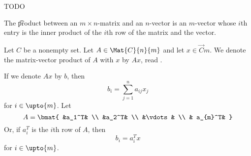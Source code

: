 
\sbasic






























\sstart
{}


TODO


The \t{product} between an $m \times n$-matrix and an $n$-vector is an $m$-vector whose $i$th entry is the inner product of the $i$th row of the matrix and the vector.


Let $C$ be a nonempty set.
Let $A \in \Mat{C}{n}{m}$ and let $x \in \Vec{C}{m}$. We denote the matrix-vector product of $A$ with $x$ by $Ax$, read .

If we denote $Ax$ by $b$, then
$$
  b_i = \sum_{j = 1}^{n} a_{ij}x_j
$$
for $i \in \upto{m}$.
Let
$$
  A = \bmat{
    &a_1^T& \\
    &a_2^T& \\
    &\vdots & \\
    & a_{m}^T&
  }
$$
Or, if $a_i^T$ is the $i$th row of $A$, then
$$
  b_i = a_i^T x
$$
for $i \in \upto{m}$.
\strats
